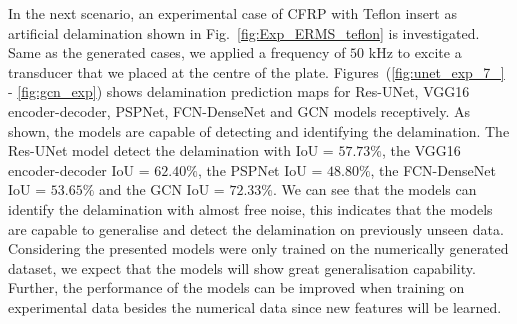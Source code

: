 In the next scenario, an experimental case of CFRP with Teflon insert as artificial delamination shown in Fig.~\ref{fig:Exp_ERMS_teflon} is investigated.  
Same as the generated cases, we applied a frequency of \(50\) kHz to excite a transducer that we placed at the centre of the plate.
Figures~(\ref{fig:unet_exp_7_} - \ref{fig:gcn_exp}) shows delamination prediction maps for Res-UNet, VGG16 encoder-decoder, PSPNet, FCN-DenseNet and GCN models receptively.
As shown, the models are capable of detecting and identifying the delamination. 
The Res-UNet model detect the delamination with IoU = \(57.73\%\), the VGG16 encoder-decoder IoU  = \(62.40\%\), the PSPNet IoU = \(48.80\%\), the FCN-DenseNet IoU = \(53.65\%\) and the GCN IoU = \(72.33\%\).
We can see that the models can identify the delamination with almost free noise, this indicates that the models are capable to generalise and detect the delamination on previously unseen data. 
Considering the presented models were only trained on the numerically generated dataset, we expect that the models will show great generalisation capability.
Further, the performance of the models can be improved when training on experimental data besides the numerical data since new features will be learned. 
